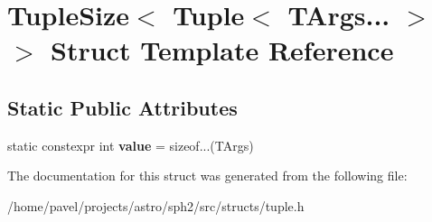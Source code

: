 \hypertarget{structTupleSize_3_01Tuple_3_01TArgs_8_8_8_01_4_01_4}{}\section{Tuple\+Size$<$ Tuple$<$ T\+Args... $>$ $>$ Struct Template Reference}
\label{structTupleSize_3_01Tuple_3_01TArgs_8_8_8_01_4_01_4}
\subsection*{Static Public Attributes}
\begin{DoxyCompactItemize}
\item 
\hypertarget{structTupleSize_3_01Tuple_3_01TArgs_8_8_8_01_4_01_4_a7e3c26d99ebad89c1a47242dcb2fe4ad}{}\label{structTupleSize_3_01Tuple_3_01TArgs_8_8_8_01_4_01_4_a7e3c26d99ebad89c1a47242dcb2fe4ad} 
static constexpr int {\bfseries value} = sizeof...(T\+Args)
\end{DoxyCompactItemize}


The documentation for this struct was generated from the following file\+:\begin{DoxyCompactItemize}
\item 
/home/pavel/projects/astro/sph2/src/structs/tuple.\+h\end{DoxyCompactItemize}
